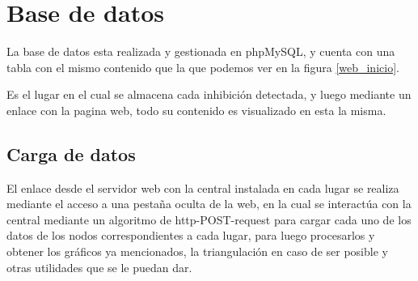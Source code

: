 \section{Base de datos}
La base de datos esta realizada y gestionada en phpMySQL, y cuenta con una tabla con el mismo contenido que la que podemos ver en la figura \ref{web_inicio}. \par 
Es el lugar en el cual se almacena cada inhibición detectada, y luego mediante un enlace con la pagina web, todo su contenido es visualizado en esta la misma. 
\subsection{Carga de datos}
\par El enlace desde el servidor web con la central instalada en cada lugar se realiza mediante el acceso a una pestaña oculta de la web, en la cual se interactúa con la central mediante un algoritmo de http-POST-request para cargar cada uno de los datos de los nodos correspondientes a cada lugar, para luego procesarlos y obtener los gráficos ya mencionados, la triangulación en caso de ser posible y otras utilidades que se le puedan dar. 
